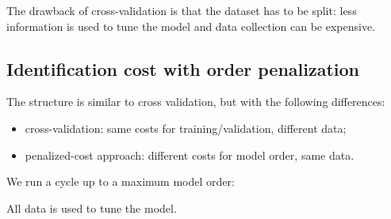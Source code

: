 The drawback of cross-validation is that the dataset has to be split: less information is used to tune the model and data collection can be expensive.


\subsection{Identification cost with order penalization}
The structure is similar to cross validation, but with the following differences:
\begin{itemize}
    \item cross-validation: same costs for training/validation, different data;
    \item penalized-cost approach: different costs for model order, same data.
\end{itemize}
We run a cycle up to a maximum model order:


All data is used to tune the model.

